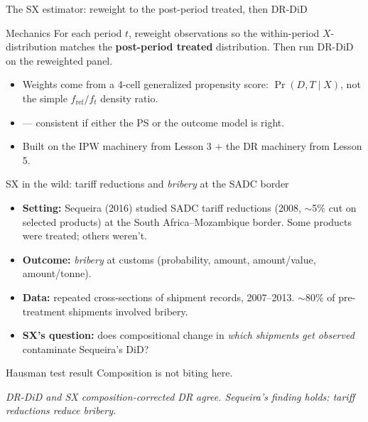 \documentclass[aspectratio=169,11pt]{beamer}
\begin{document}
\begin{frame}{The SX estimator: reweight to the post-period treated, then DR-DiD}
\vspace{0.5em}
\begin{block}{Mechanics}
\small
For each period $t$, reweight observations so the within-period $X$-distribution matches the \textbf{post-period treated} distribution. \;Then run DR-DiD on the reweighted panel.
\end{block}
\vspace{0.5em}
\begin{itemize}\small
  \item Weights come from a 4-cell generalized propensity score: $\Pr(D, T \mid X)$, not the simple $f_{\text{ref}}/f_t$ density ratio.
  \item {} --- consistent if either the PS or the outcome model is right.
  \item Built on the IPW machinery from Lesson 3 $+$ the DR machinery from Lesson 5.
\end{itemize}
\end{frame}

\begin{frame}{SX in the wild: tariff reductions and \textit{bribery} at the SADC border}
\vspace{0.3em}
\begin{itemize}\small
  \item \textbf{Setting:} Sequeira (2016) studied SADC tariff reductions (2008, $\sim$5\% cut on selected products) at the South Africa--Mozambique border. \;Some products were treated; others weren't.
  \item \textbf{Outcome:} \textit{bribery} at customs (probability, amount, amount/value, amount/tonne).
  \item \textbf{Data:} repeated cross-sections of shipment records, 2007--2013. \;$\sim$80\% of pre-treatment shipments involved bribery.
  \item \textbf{SX's question:} does compositional change in \textit{which shipments get observed} contaminate Sequeira's DiD?
\end{itemize}
\vspace{0.2em}
\begin{block}{Hausman test result}
\centering
\small {} \;Composition is not biting here.
\end{block}
\vspace{0.1em}
\begin{center}
\small\color{warmgray}\itshape
DR-DiD and SX composition-corrected DR agree. \;Sequeira's finding holds: tariff reductions reduce bribery.
\end{center}
\end{frame}
\end{document}
